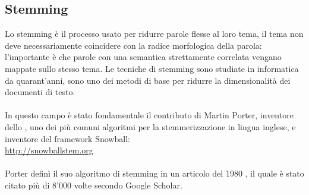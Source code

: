 \documentclass{article}
\theoremstyle{plain}
\theoremstyle{definition}
\begin{document}
\subsection{Stemming}
Lo stemming è il processo usato per ridurre parole flesse al loro tema, il tema non deve necessariamente coincidere con la radice morfologica della parola: l'importante è che parole con una semantica strettamente correlata vengano mappate sullo stesso tema. Le tecniche di stemming sono studiate in informatica da quarant'anni, sono uno dei metodi di base per ridurre la dimensionalità dei documenti di testo.
\\
\\
In questo campo è stato fondamentale il contributo di Martin Porter, inventore dello , uno dei più comuni algoritmi per la stemmerizzazione in lingua inglese, e inventore del framework Snowball:
\\
\url{http://snowballstem.org}
\\
\\
Porter definì il suo algoritmo di stemming in un articolo del 1980 , il quale è stato citato più di 8'000 volte secondo Google Scholar.
\end{document}
